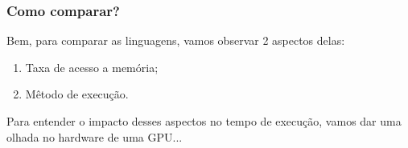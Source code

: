 \documentclass[brazil]{beamer}
\begin{document}

\begin{frame}[fragile]
  \frametitle{Como comparar?}
  Bem, para comparar as linguagens, vamos observar 2 aspectos delas:
  \begin{enumerate}
    \item Taxa de acesso a memória;
    \item Mêtodo de execução.
  \end{enumerate}
  Para entender o impacto desses aspectos no tempo de execução, vamos dar uma olhada no hardware de uma GPU...
\end{frame}
\end{document}
